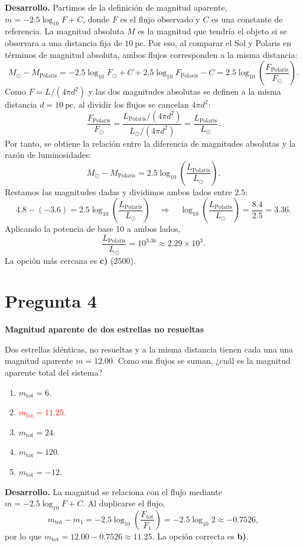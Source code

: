 \documentclass[a4paper,11pt]{article}
\newcommand{\pregunta}[2]{\section*{Pregunta #1}\textbf{#2}\par}
\begin{document}
\textbf{Desarrollo.} Partimos de la definición de magnitud aparente, $m=-2.5\log_{10}F+C$, donde $F$ es el flujo observado y $C$ es una constante de referencia. La magnitud absoluta $M$ es la magnitud que tendría el objeto si se observara a una distancia fija de $10\ \mathrm{pc}$. Por eso, al comparar el Sol y Polaris en términos de magnitud absoluta, ambos flujos corresponden a la misma distancia:
\[
M_\odot-M_{\mathrm{Polaris}}
=-2.5\log_{10}F_\odot+C+2.5\log_{10}F_{\mathrm{Polaris}}-C
=2.5\log_{10}\left(\frac{F_{\mathrm{Polaris}}}{F_\odot}\right).
\]
Como $F=L/(4\pi d^2)$ y las dos magnitudes absolutas se definen a la misma distancia $d=10\ \mathrm{pc}$, al dividir los flujos se cancelan $4\pi d^2$:
\[
\frac{F_{\mathrm{Polaris}}}{F_\odot}
=\frac{L_{\mathrm{Polaris}}/(4\pi d^2)}{L_\odot/(4\pi d^2)}
=\frac{L_{\mathrm{Polaris}}}{L_\odot}.
\]
Por tanto, se obtiene la relación entre la diferencia de magnitudes absolutas y la razón de luminosidades:
\[
M_\odot-M_{\mathrm{Polaris}}
=2.5\log_{10}\left(\frac{L_{\mathrm{Polaris}}}{L_\odot}\right).
\]
Restamos las magnitudes dadas y dividimos ambos lados entre $2.5$:
\[
4.8-(-3.6)=2.5\log_{10}\left(\frac{L_{\mathrm{Polaris}}}{L_\odot}\right)
\quad\Longrightarrow\quad
\log_{10}\left(\frac{L_{\mathrm{Polaris}}}{L_\odot}\right)=\frac{8.4}{2.5}=3.36.
\]
Aplicando la potencia de base 10 a ambos lados,
\[
\frac{L_{\mathrm{Polaris}}}{L_\odot}=10^{3.36}\approx2.29\times10^3.
\]
La opción más cercana es \textbf{c)} ($2500$). \parencite[Sec. 7.3.3.1, pp. 244--246]{chaparro2026}

\pregunta{4}{Magnitud aparente de dos estrellas no resueltas}

Dos estrellas idénticas, no resueltas y a la misma distancia tienen cada una una magnitud aparente $m=12.00$. Como sus flujos se suman, ¿cuál es la magnitud aparente total del sistema?

\begin{enumerate}
    \item $m_{\mathrm{tot}}=6$.
    \item \textcolor{red}{$m_{\mathrm{tot}}=11.25$.}
    \item $m_{\mathrm{tot}}=24$.
    \item $m_{\mathrm{tot}}=120$.
    \item $m_{\mathrm{tot}}=-12$.
\end{enumerate}

\textbf{Desarrollo.} La magnitud se relaciona con el flujo mediante $m=-2.5\log_{10}F+C$. Al duplicarse el flujo,
\[
m_{\mathrm{tot}}-m_1=-2.5\log_{10}\left(\frac{F_{\mathrm{tot}}}{F_1}\right)
=-2.5\log_{10}2\approx-0.7526,
\]
por lo que $m_{\mathrm{tot}}=12.00-0.7526\approx11.25$. La opción correcta es \textbf{b)}. \parencite[Sec. 7.3.3, pp. 243--244]{chaparro2026}
\end{document}
